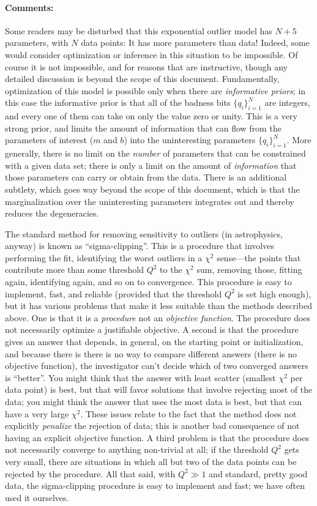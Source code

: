 \documentclass[12pt,twoside]{article}
\newcommand{\documentname}{document}
\newcommand{\commentsname}{Comments}
\newcounter{problem}
\newenvironment{comments}{\paragraph{\commentsname:}}{}
\newcommand{\setofall}[3]{\{{#1}\}_{{#2}}^{{#3}}}
\newcommand{\allq}{\setofall{q_i}{i=1}{N}}
\begin{document}
\begin{comments}
Some readers may be disturbed that this exponential outlier model has
$N+5$ parameters, with $N$ data points: It has more parameters than
data!  Indeed, some would consider optimization or inference in this
situation to be impossible.  Of course it is not impossible, and for
reasons that are instructive, though any detailed discussion is beyond
the scope of this \documentname.  Fundamentally, optimization of this
model is possible only when there are \emph{informative priors}; in
this case the informative prior is that all of the badness bits
$\allq$ are integers, and every one of them can take on only the value
zero or unity.  This is a very strong prior, and limits the amount of
information that can flow from the parameters of interest ($m$ and
$b$) into the uninteresting parameters $\allq$.  More generally, there
is no limit on the \emph{number} of parameters that can be constrained
with a given data set; there is only a limit on the amount of
\emph{information} that those parameters can carry or obtain from the
data.  There is an additional subtlety, which goes way beyond the
scope of this document, which is that the marginalization over the
uninteresting parameters integrates out and thereby reduces the
degeneracies.

The standard method for removing sensitivity to outliers (in
astrophysics, anyway) is known as ``sigma-clipping''.  This is a
procedure that involves performing the fit, identifying the worst
outliers in a $\chi^2$ sense---the points that contribute more than
some threshold $Q^2$ to the $\chi^2$ sum, removing those, fitting
again, identifying again, and so on to convergence.  This procedure is
easy to implement, fast, and reliable (provided that the threshold
$Q^2$ is set high enough), but it has various problems that make it
less suitable than the methods described above.  One is that it is a
\emph{procedure} not an \emph{objective function}.  The procedure does
not necessarily optimize a justifiable objective.  A second is that
the procedure gives an answer that depends, in general, on the
starting point or initialization, and because there is there is no way
to compare different answers (there is no objective function), the
investigator can't decide which of two converged answers is
``better''.  You might think that the answer with least scatter
(smallest $\chi^2$ per data point) is best, but that will favor
solutions that involve rejecting most of the data; you might think the
answer that uses the most data is best, but that can have a very
large $\chi^2$.  These issues relate to the fact that the method does
not explicitly \emph{penalize} the rejection of data; this is another
bad consequence of not having an explicit objective function.  A third
problem is that the procedure does not necessarily converge to
anything non-trivial at all; if the threshold $Q^2$ gets very small,
there are situations in which all but two of the data points can be
rejected by the procedure.  All that said, with $Q^2\gg 1$ and
standard, pretty good data, the sigma-clipping procedure is easy to
implement and fast; we have often used it ourselves.


\end{comments}
\end{document}
